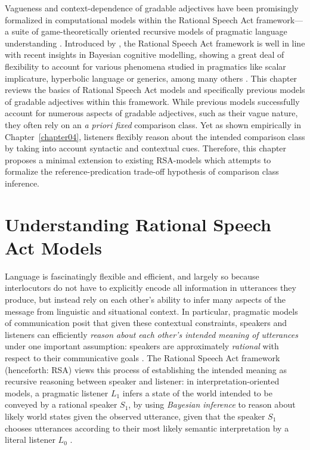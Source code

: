 Vagueness and context-dependence of gradable adjectives have been promisingly formalized in computational models within the Rational Speech Act framework---a suite of game-theoretically oriented recursive models of pragmatic language understanding \parencite[e.g.,][]{goodman2016, lassiter2017adjectival, tessler2017warm}. Introduced by \textcite{frank2012predicting}, the Rational Speech Act framework is well in line with recent insights in Bayesian cognitive modelling, showing a great deal of flexibility to account for various phenomena studied in pragmatics like scalar implicature, hyperbolic language or generics, among many others \parencite[e.g.,][]{tenenbaum2011grow, problang}. This chapter reviews the basics of Rational Speech Act models and specifically previous models of gradable adjectives within this framework. While previous models successfully account for numerous aspects of gradable adjectives, such as their vague nature, they often rely on an \emph{a priori fixed} comparison class. Yet as shown empirically in Chapter~\ref{chapter04}, listeners flexibly reason about the intended comparison class by taking into account syntactic and contextual cues. Therefore, this chapter proposes a minimal extension to existing RSA-models which attempts to formalize the reference-predication trade-off hypothesis of comparison class inference.%
  
\section{Understanding Rational Speech Act Models}
\label{intro-rsa}
Language is fascinatingly flexible and efficient, and largely so because interlocutors do not have to explicitly encode all information in utterances they produce, but instead rely on each other's ability to infer many aspects of the message from linguistic and situational context. In particular, pragmatic models of communication posit that given these contextual constraints, speakers and listeners can efficiently \emph{reason about each other's intended meaning of utterances} under one important assumption: speakers are approximately \emph{rational} with respect to their communicative goals \parencite{frank2012predicting}. The Rational Speech Act framework (henceforth: RSA) views this process of establishing the intended meaning as recursive reasoning between speaker and listener: in interpretation-oriented models, a pragmatic listener $L_1$ infers a state of the world intended to be conveyed by a rational speaker $S_1$, by using \emph{Bayesian inference} to reason about likely world states given the observed utterance, given that the speaker $S_1$ chooses utterances according to their most likely semantic interpretation by a literal listener $L_0$ \parencite{problang}.  

